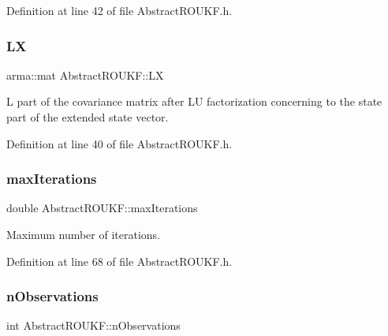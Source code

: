 Definition at line 42 of file Abstract\+R\+O\+U\+K\+F.\+h.

\mbox{\label{classAbstractROUKF_a5dfab9d5823117885e01db2e591eeb59}} 
\subsubsection{\texorpdfstring{LX}{LX}}
{\footnotesize\ttfamily arma\+::mat Abstract\+R\+O\+U\+K\+F\+::\+LX\hspace{0.3cm}{\ttfamily [protected]}}

L part of the covariance matrix after LU factorization concerning to the state part of the extended state vector. 

Definition at line 40 of file Abstract\+R\+O\+U\+K\+F.\+h.

\mbox{\label{classAbstractROUKF_a268b49ab648ee8013b15ef5127d4fef1}} 
\subsubsection{\texorpdfstring{max\+Iterations}{maxIterations}}
{\footnotesize\ttfamily double Abstract\+R\+O\+U\+K\+F\+::max\+Iterations\hspace{0.3cm}{\ttfamily [protected]}}

Maximum number of iterations. 

Definition at line 68 of file Abstract\+R\+O\+U\+K\+F.\+h.

\mbox{\label{classAbstractROUKF_a4f6403f7fd2fac691e4ac516f47c0a06}} 
\subsubsection{\texorpdfstring{n\+Observations}{nObservations}}
{\footnotesize\ttfamily int Abstract\+R\+O\+U\+K\+F\+::n\+Observations\hspace{0.3cm}{\ttfamily [protected]}}

